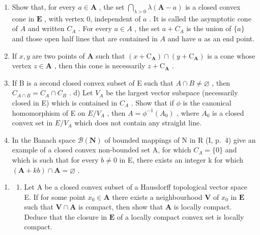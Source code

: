 \begin{enumerate}
\def\labelenumi{\alph{enumi})}
\item
  Show that, for every \(a \in \mathbf{A}\) , the set \(\bigcap_{\lambda > 0} \lambda(\mathbf{A} - a)\) is a closed convex cone in \(\mathbf{E}\) , with vertex 0, independent of \(a\) . It is called the asymptotic cone of \(A\) and written \(C_A\) . For every \(a \in A\) , the set \(a + C_A\) is the union of \(\{a\}\) and those open half lines that are contained in \(A\) and have \(a\) as an end point.
\item
  If \(x, y\) are two points of \(\mathbf{A}\) such that \((x + \mathrm{C}_{\mathbf{A}}) \cap (y + \mathrm{C}_{\mathbf{A}})\) is a cone whose vertex \(z \in \mathbf{A}\) , then this cone is necessarily \(z + \mathrm{C}_{\mathbf{A}}\) .
\item
  If B is a second closed convex subset of E such that \(A \cap B \neq \varnothing\) , then \(C_{A \cap B} = C_{A} \cap C_{B}\) . d) Let \(V_{A}\) be the largest vector subspace (necessarily closed in E) which is contained in \(C_{A}\) . Show that if \(\phi\) is the canonical homomorphism of E on \(E/V_{A}\) , then \(A = \phi^{-1}(A_{0})\) , where \(A_{0}\) is a closed convex set in \(E/V_{A}\) which does not contain any straight line.
\item
  In the Banach space \(\mathcal{B}(\mathbf{N})\) of bounded mappings of N in R (I, p.~4) give an example of a closed convex non-bounded set A, for which \(C_{A} = \{0\}\) and which is such that for every \(b \neq 0\) in E, there exists an integer k for which \((\mathbf{A} + kb) \cap \mathbf{A} = \varnothing\) .
\end{enumerate}

\begin{enumerate}
\def\labelenumi{\arabic{enumi})}
\setcounter{enumi}{14}
\tightlist
\item
  \begin{enumerate}
  \def\labelenumii{\alph{enumii})}
  \tightlist
  \item
    Let A be a closed convex subset of a Hausdorff topological vector space E. If for some point \(x_0 \in \mathbf{A}\) there exists a neighbourhood \(\mathbf{V}\) of \(x_0\) in \(\mathbf{E}\) such that \(\mathbf{V} \cap \mathbf{A}\) is compact, then show that \(\mathbf{A}\) is locally compact. Deduce that the closure in \(\mathbf{E}\) of a locally compact convex set is locally compact.
  \end{enumerate}
\end{enumerate}


